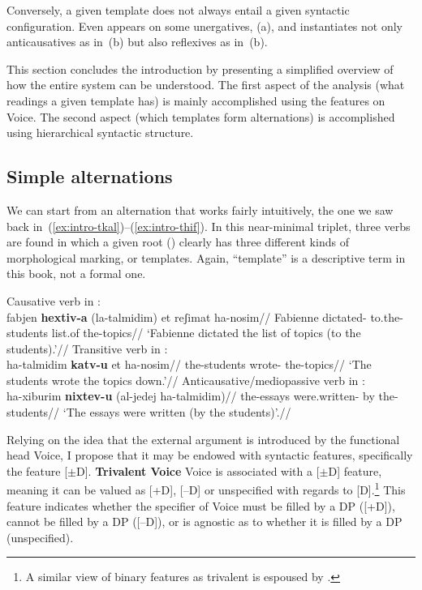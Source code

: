 Conversely, a given template does not always entail a given syntactic configuration. Even {\tnif} appears on some unergatives, (\nextx a), and {\thit} instantiates not only anticausatives as in~(\lastx b) but also reflexives as in~(\nextx b).
\ex\label{ex:counter2}
\xe

This section concludes the introduction by presenting a simplified overview of how the entire system can be understood. The first aspect of the analysis (what readings a given template has) is mainly accomplished using the features on Voice. The second aspect (which templates form alternations) is accomplished using hierarchical syntactic structure.

	\subsection{Simple alternations}
We can start from an alternation that works fairly intuitively, the one we saw back in~(\ref{ex:intro-tkal})--(\ref{ex:intro-thif}). In this near-minimal triplet, three verbs are found in which a given root () clearly has three different kinds of morphological marking, or templates. Again, ``template'' is a descriptive term in this book, not a formal one.

\pex\label{ex:general}
	\a Causative verb in {\thif}:\\
		\begingl
		\gla fabjen \textbf{hextiv-a} (la-talmidim) et reʃimat ha-nosim//
		\glb Fabienne dictated- to.the-students  list.of the-topics//
		\glft `Fabienne dictated the list of topics (to the students).'//
	\endgl	
	\a Transitive verb in {\tkal}:\\
		\begingl
		\gla ha-talmidim \textbf{katv-u} et ha-nosim//
		\glb the-students wrote-  the-topics//
		\glft `The students wrote the topics down.'//
	\endgl
	\a Anticausative/mediopassive verb in {\tnif}:\\
		\begingl
		\gla ha-xiburim \textbf{nixtev-u} (al-jedej ha-talmidim)//
		\glb the-essays were.written- by the-students//
		\glft `The essays were written (by the students)'.//
	\endgl
\xe

Relying on the idea that the external argument is introduced by the functional head Voice, I propose that it may be endowed with syntactic features, specifically the feature [$\pm$D].
\pex \textbf{Trivalent Voice}
	\a Voice is associated with a [$\pm$D] feature, meaning it can be valued as [+D], [--D] or unspecified with regards to [D].\footnote{A similar view of binary features as trivalent is espoused by \cite{harbour11}.}
	\a This feature indicates whether the specifier of Voice must be filled by a DP ([+D]), cannot be filled by a DP ([--D]), or is agnostic as to whether it is filled by a DP (unspecified).
\xe

